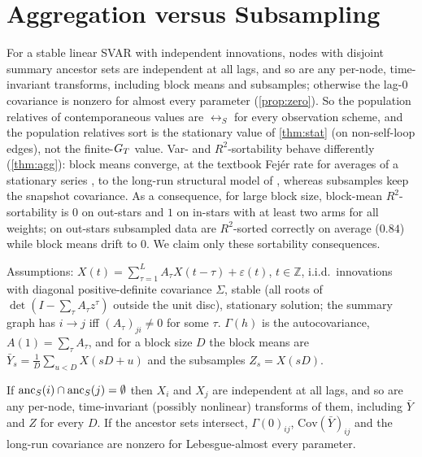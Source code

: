 \section{Aggregation versus Subsampling}
\label{app:agg}\label{sec:agg}

For a stable linear SVAR with independent innovations, nodes with disjoint
summary ancestor sets are independent at all lags, and so are any per-node,
time-invariant transforms, including block means and subsamples; otherwise
the lag-0 covariance is nonzero for almost every parameter
(\cref{prop:zero}). So the population relatives of
contemporaneous values are $\rel_S$ for every observation scheme, and the
population relatives sort is the stationary value of \cref{thm:stat} (on
non-self-loop edges), not the finite-$G_T$ value. Var- and $R^2$-sortability
behave differently (\cref{thm:agg}): block means converge, at the textbook
Fej\'er rate for averages of a stationary series
\citep[Ch.~7]{brockwell1991time}, to the long-run structural model of
\citet{gong2017aggregated}, whereas subsamples keep the snapshot covariance. As a
consequence, for large block size, block-mean $R^2$-sortability is $0$ on
out-stars and $1$ on in-stars with at least two arms for all weights; on
out-stars subsampled data are $R^2$-sorted correctly on average ($0.84$) while
block means drift to $0$. We claim only these sortability consequences.


Assumptions: $X(t)=\sum_{\tau=1}^{L}A_\tau X(t-\tau)+\varepsilon(t)$, $t\in\mathbb Z$,
i.i.d.\ innovations with diagonal positive-definite covariance $\Sigma$, stable
(all roots of $\det(I-\sum_\tau A_\tau z^\tau)$ outside the unit disc),
stationary solution; the summary graph has $i\to j$ iff $(A_\tau)_{ji}\ne0$ for
some $\tau$. $\Gamma(h)$ is the autocovariance, $A(1)=\sum_\tau A_\tau$, and for a
block size $D$ the block means are $\bar Y_s=\frac1D\sum_{u<D}X(sD{+}u)$ and the
subsamples $Z_s=X(sD)$.

\begin{proposition}\label{prop:zero}
If $\mathrm{anc}_S(i)\cap\mathrm{anc}_S(j)=\emptyset$ then $X_i$ and $X_j$ are independent at
all lags, and so are any per-node, time-invariant (possibly nonlinear)
transforms of them, including $\bar Y$ and $Z$ for every $D$. If the
ancestor sets intersect, $\Gamma(0)_{ij}$, $\mathrm{Cov}(\bar Y)_{ij}$ and the
long-run covariance are nonzero for Lebesgue-almost every parameter.
\end{proposition}

